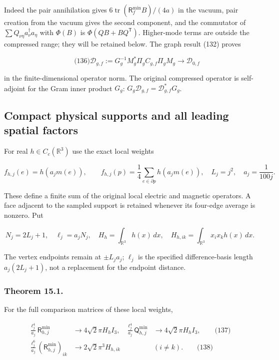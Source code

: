Indeed the pair annihilation gives
\(6\operatorname{tr}(\mathsf R_f^{\min}B)/(4a)\) in the vacuum, pair
creation from the vacuum gives the second component, and the commutator
of \(\sum Q_{\nu\eta}a_\nu^\dagger a_\eta\) with \(\Phi(B)\) is
\(\Phi(QB+BQ^{\mathsf T})\). Higher-mode terms are outside the
compressed range; they will be retained below. The graph result (132)
proves

\[
\qquad\text{(136)}
 \mathcal D_{g,f}:=
 G_g^{-1}M_g^*\Pi_gC_{g,f}\Pi_gM_g
 \longrightarrow\mathcal D_{0,f}
\]

in the finite-dimensional operator norm. The original compressed
operator is self-adjoint for the Gram inner product \(G_g\):
\(G_g\mathcal D_{g,f}=\mathcal D_{g,f}^*G_g\).

\subsection{Compact physical supports and all leading spatial
factors}\label{local-energy-band-transfer-md-compact-physical-supports-and-all-leading-spatial-factors}

For real \(h\in C_c(\mathbb R^3)\) use the exact local weights

\[
f_{h,j}(e)=h(a_jm(e)),\qquad
 f_{h,j}(p)=\frac14\sum_{e\in\partial p}h(a_jm(e)),
 \quad L_j=j^2,\quad a_j=\frac1{100j}.
\]

These define a finite sum of the original local electric and magnetic
operators. A face adjacent to the sampled support is retained whenever
its four-edge average is nonzero. Put

\[
N_j=2L_j+1,\quad \ell_j=a_jN_j,\quad
 H_h=\int_{\mathbb R^3}h(x)\,dx,\quad
 H_{h,ik}=\int_{\mathbb R^3}x_ix_kh(x)\,dx.
\]

The vertex endpoints remain at \(\pm L_ja_j\); \(\ell_j\) is the
specified difference-basis length \(a_j(2L_j+1)\), not a replacement for
the endpoint distance.

\subsubsection{Theorem 15.1.}\label{local-energy-band-transfer-md-theorem-15.1.}

For the full comparison matrices of these local weights,

\[
\begin{aligned}
 \frac{\ell_j^4}{a_j}\mathsf R_{h,j}^{\min}
 &\longrightarrow4\sqrt2\pi H_h I_3,
 &
 \frac{\ell_j^4}{a_j}\mathsf Q_{h,j}^{\min}
 &\longrightarrow4\sqrt2\pi H_h I_3, \qquad\text{(137)}\\
 \frac{\ell_j^6}{a_j}(\mathsf R_{h,j}^{\min})_{ik}
 &\longrightarrow2\sqrt2\pi^3 H_{h,ik}
 &&(i\ne k). \qquad\text{(138)}
\end{aligned}
\]

